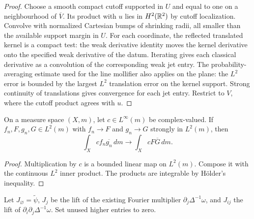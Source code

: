 \begin{proof}
\leanok
Choose a smooth compact cutoff supported in $U$ and equal to one on a
neighbourhood of $\overline V$. Its product with $u$ lies in $H^2(\mathbb{R}^2)$
by cutoff localization. Convolve with normalized Cartesian bumps of
shrinking radii, all smaller than the available support margin in $U$.
For each coordinate, the reflected translated kernel is a compact test:
the weak derivative identity moves the kernel derivative onto the
specified weak derivative of the datum. Iterating gives each classical
derivative as a convolution of the corresponding weak jet entry.
The probability-averaging estimate used for the line mollifier also applies
on the plane: the $L^2$ error is bounded by the largest $L^2$ translation
error on the kernel support. Strong continuity of translations gives
convergence for each jet entry. Restrict to $V$, where the cutoff product
agrees with $u$.
\end{proof}

\begin{lemma}
\label{lem:l2-product-integral-stability}
\leanok
On a measure space $(X,m)$, let $c\in L^\infty(m)$ be complex-valued.
If $f_n,F,g_n,G\in L^2(m)$ with
$f_n\to F$ and $g_n\to G$ strongly in $L^2(m)$, then
\[
 \int_X c f_n\overline{g_n}\,dm
 \longrightarrow \int_X c F\overline G\,dm.
\]
\end{lemma}

\begin{proof}
\leanok
Multiplication by $c$ is a bounded linear map on $L^2(m)$.
Compose it with the continuous $L^2$ inner product. The products are
integrable by Hölder's inequality.
\end{proof}

\begin{definition}
\label{def:stream-second-jet}
\leanok
Let $J_\varnothing=\widetilde\psi$, $J_j$ be the lift of the existing
Fourier multiplier $\partial_j\Delta^{-1}\omega$, and $J_{ij}$ the lift of
$\partial_i\partial_j\Delta^{-1}\omega$. Set unused higher entries to zero.
\end{definition}

